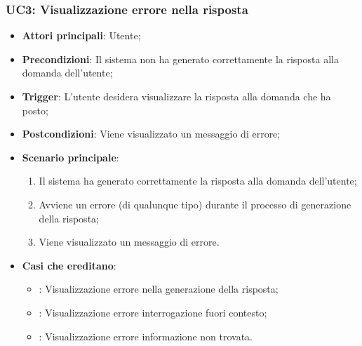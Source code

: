 \subsubsection{UC3: Visualizzazione errore nella risposta}
\begin{itemize}
    \item \textbf{Attori principali}: Utente;
    \item \textbf{Precondizioni}: Il sistema non ha generato correttamente la risposta alla domanda dell'utente;
    \item \textbf{Trigger}: L'utente desidera visualizzare la risposta alla domanda che ha posto;
    \item \textbf{Postcondizioni}: Viene visualizzato un messaggio di errore;
    \item \textbf{Scenario principale}:
    \begin{enumerate}
        \item Il sistema ha generato correttamente la risposta alla domanda dell'utente;
        \item Avviene un errore (di qualunque tipo) durante il processo di generazione della risposta;
        \item Viene visualizzato un messaggio di errore.
    \end{enumerate}
    \item \textbf{Casi che ereditano}:
    \begin{itemize}
        \item {}: Visualizzazione errore nella generazione della risposta;
        \item {}: Visualizzazione errore interrogazione fuori contesto;
        \item {}: Visualizzazione errore informazione non trovata.
    \end{itemize}
\end{itemize}

\hypertarget{UC4}{}
